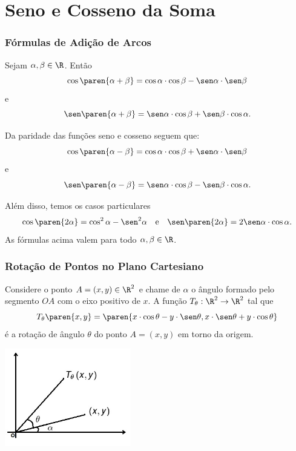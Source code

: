 \section{Seno e Cosseno da Soma}
\begin{frame}
\frametitle{Fórmulas de Adição de Arcos} 

\begin{proposicao}
Sejam $\alpha, \beta \in \R$. Então
$$\cos \paren{\alpha + \beta} = \cos \alpha \cdot \cos \beta - \sen
\alpha \cdot \sen \beta$$ e
$$\sen \paren{\alpha + \beta} = \sen \alpha \cdot \cos \beta +\sen \beta \cdot
\cos \alpha.$$
\end{proposicao}\pause
Da paridade das funções seno e cosseno seguem que:
$$\cos \paren{\alpha - \beta} = \cos \alpha \cdot \cos \beta + \sen
\alpha \cdot \sen \beta$$ e
$$\sen \paren{\alpha - \beta} = \sen \alpha \cdot \cos \beta - \sen \beta \cdot
\cos \alpha.$$

Além disso, temos os casos particulares
$$\cos \paren{2\alpha } = \cos^2 \alpha  - \sen^2 \alpha \ \ \text{ e }
\ \ \sen \paren{2\alpha } = 2\sen \alpha \cdot \cos \alpha.$$ As
fórmulas acima valem para todo $\alpha, \beta \in \R$.


\end{frame}

\begin{frame}
\frametitle{Rotação de Pontos no Plano Cartesiano} 

Considere o ponto $A = (x, y) \in \R^2$ e chame de $\alpha$ o ângulo
formado pelo segmento $OA$ com o eixo positivo de $x$. A função
$T_{\theta} : \R^2 \to \R^2$  tal que
$$T_{\theta}\paren{x, y} = \paren{x\cdot \cos \theta - y\cdot \sen \theta, x\cdot \sen \theta + y\cdot \cos
\theta}$$ é a rotação de ângulo $\theta$ do ponto $A = (x,y)$ em
torno da origem.

\begin{center}
\includegraphics[width=5.5cm]{figures/rotacao.jpg}
\end{center}


\end{frame}

